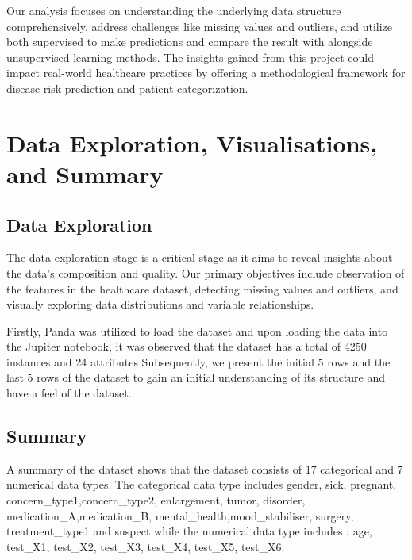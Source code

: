 \documentclass[a4paper]{article}
\begin{document}
Our analysis focuses on understanding the underlying data structure comprehensively, address challenges like missing values and outliers, and utilize both supervised to make predictions and compare the result with alongside unsupervised learning methods. The insights gained from this project could impact real-world healthcare practices by offering a methodological framework for disease risk prediction and patient categorization.



\section{Data Exploration, Visualisations, and Summary}
\subsection{Data Exploration}
 The data exploration stage is a critical stage as it aims to reveal insights about the data’s composition and quality. Our primary objectives include observation of the features in the healthcare dataset, detecting missing values and outliers, and visually exploring data distributions and variable relationships. 
 
 Firstly, Panda was utilized to load the dataset and upon loading the data into the Jupiter notebook, it was observed that the dataset has a total of 4250 instances and 24 attributes Subsequently, we present the initial 5 rows and the last 5 rows of the dataset to gain an initial understanding of its structure and have a feel of the dataset. 
 \subsection{Summary}
 A summary of the dataset shows that the dataset consists of 17 categorical and 7 numerical data types. The categorical data type includes gender, sick, pregnant, concern\_type1,concern\_type2, enlargement, tumor, disorder, medication\_A,medication\_B, mental\_health,mood\_stabiliser, surgery, treatment\_type1 and 
 suspect while the numerical data type includes : 
 age, test\_X1, test\_X2, test\_X3, test\_X4, test\_X5, test\_X6. 
 
\end{document}
